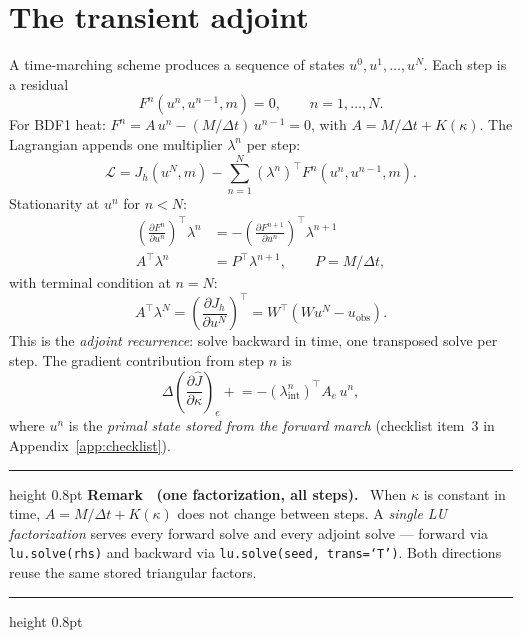 \documentclass[11pt]{article}
\newcounter{remark}
\newenvironment{remark}[1]{%
  \refstepcounter{remark}\par\medskip
  \noindent\begin{minipage}{\linewidth}
  \hrule height 0.8pt \smallskip
  \textbf{Remark \theremark\ (#1).}\ }{%
  \smallskip\hrule height 0.8pt \end{minipage}\par\medskip}
\begin{document}
\section{The transient adjoint}
\label{sec:transient}

A time-marching scheme produces a sequence of states
$u^0, u^1, \ldots, u^N$.  Each step is a residual
\begin{equation}
  F^n(u^n, u^{n-1}, m) = 0 , \qquad n = 1, \ldots, N .
\end{equation}
For BDF1 heat: $F^n = A\,u^n - (M/\Delta t)\,u^{n-1} = 0$, with
$A = M/\Delta t + K(\kappa)$.  The Lagrangian appends one multiplier
$\lambda^n$ per step:
\begin{equation}
  \mathcal{L} = J_h(u^N, m)
  - \sum_{n=1}^N (\lambda^n)^\top F^n(u^n, u^{n-1}, m).
\end{equation}
Stationarity at $u^n$ for $n < N$:
\begin{align}
  \left(\frac{\partial F^n}{\partial u^n}\right)^\top \lambda^n
  &= -\left(\frac{\partial F^{n+1}}{\partial u^n}\right)^\top \lambda^{n+1}
  \nonumber\\
  A^\top \lambda^n &= P^\top \lambda^{n+1},
  \qquad P = M/\Delta t , \label{eq:adjrec}
\end{align}
with terminal condition at $n = N$:
\begin{equation}
  A^\top \lambda^N = \left(\frac{\partial J_h}{\partial u^N}\right)^\top
  = W^\top(W u^N - u_{\mathrm{obs}}) .
  \label{eq:adjterm}
\end{equation}
This is the \emph{adjoint recurrence}: solve backward in time, one
transposed solve per step.  The gradient contribution from step $n$ is
\begin{equation}
  \Delta\!\left(\frac{\partial \hat{J}}{\partial \kappa}\right)_e
  \mathrel{+}=
  -(\lambda^n_{\mathrm{int}})^\top A_e\, u^n,
  \label{eq:trangrad}
\end{equation}
where $u^n$ is the \emph{primal state stored from the forward march}
(checklist item~3 in Appendix~\ref{app:checklist}).

\begin{remark}{one factorization, all steps}
When $\kappa$ is constant in time, $A = M/\Delta t + K(\kappa)$ does
not change between steps.  A \emph{single LU factorization} serves every
forward solve and every adjoint solve --- forward via \texttt{lu.solve(rhs)}
and backward via \texttt{lu.solve(seed,~trans=`T')}.  Both directions
reuse the same stored triangular factors.
\end{remark}
\end{document}
